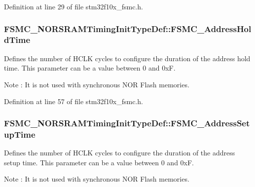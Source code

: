 Definition at line 29 of file stm32f10x\+\_\+fsmc.\+h.

\subsubsection[{\texorpdfstring{F\+S\+M\+C\+\_\+\+Address\+Hold\+Time}{FSMC_AddressHoldTime}}]{ F\+S\+M\+C\+\_\+\+N\+O\+R\+S\+R\+A\+M\+Timing\+Init\+Type\+Def\+::\+F\+S\+M\+C\+\_\+\+Address\+Hold\+Time}\hypertarget{struct_f_s_m_c___n_o_r_s_r_a_m_timing_init_type_def_a917b227ccb0a765791897ce3647ab26b}{}\label{struct_f_s_m_c___n_o_r_s_r_a_m_timing_init_type_def_a917b227ccb0a765791897ce3647ab26b}
Defines the number of H\+C\+LK cycles to configure the duration of the address hold time. This parameter can be a value between 0 and 0xF. \begin{DoxyNote}{Note}
\+: It is not used with synchronous N\+OR Flash memories. 
\end{DoxyNote}


Definition at line 57 of file stm32f10x\+\_\+fsmc.\+h.

\subsubsection[{\texorpdfstring{F\+S\+M\+C\+\_\+\+Address\+Setup\+Time}{FSMC_AddressSetupTime}}]{ F\+S\+M\+C\+\_\+\+N\+O\+R\+S\+R\+A\+M\+Timing\+Init\+Type\+Def\+::\+F\+S\+M\+C\+\_\+\+Address\+Setup\+Time}\hypertarget{struct_f_s_m_c___n_o_r_s_r_a_m_timing_init_type_def_a3d360eae9bc9afb020760d4df1659159}{}\label{struct_f_s_m_c___n_o_r_s_r_a_m_timing_init_type_def_a3d360eae9bc9afb020760d4df1659159}
Defines the number of H\+C\+LK cycles to configure the duration of the address setup time. This parameter can be a value between 0 and 0xF. \begin{DoxyNote}{Note}
\+: It is not used with synchronous N\+OR Flash memories. 
\end{DoxyNote}


